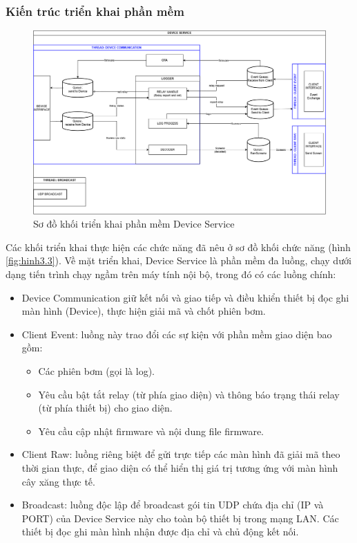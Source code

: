 \subsubsection{Kiến trúc triển khai phần mềm}

\begin{figure}[!ht]
     \centering
    \includegraphics[width=1.0\linewidth]{Figures/DeviceService_implementation-block.png}
    \caption{Sơ đồ khối triển khai phần mềm Device Service}
    \label{fig:DeviceService_implementation-block}
\end{figure}

Các khối triển khai thực hiện các chức năng đã nêu ở
sơ đồ khối chức năng (hình \ref{fig:hinh3.3}). Về mặt triển khai, Device Service là phần mềm đa luồng, chạy dưới dạng tiến trình chạy ngầm trên máy tính nội bộ, trong đó có các luồng chính:
\begin{itemize}
    \item Device Communication giữ kết nối và giao tiếp và điều khiển thiết bị đọc ghi màn hình (Device), thực hiện giải mã và chốt phiên bơm.
    \item Client Event: luồng này trao đổi các sự kiện với phần mềm giao diện bao gồm:
    \begin{itemize}
        \item Các phiên bơm (gọi là log).
        \item Yêu cầu bật tắt relay (từ phía giao diện) và thông báo trạng thái relay (từ phía thiết bị) cho giao diện.
        \item Yêu cầu cập nhật firmware và nội dung file firmware.
    \end{itemize}

    \item Client Raw: luồng riêng biệt để gửi trực tiếp các màn hình đã giải mã theo thời gian thực, để giao diện có thể hiển thị giá trị tương ứng với màn hình cây xăng thực tế.
    
    \item Broadcast: luồng độc lập để broadcast gói tin UDP chứa địa chỉ (IP và PORT) của Device Service này cho toàn bộ thiết bị trong mạng LAN. Các thiết bị đọc ghi màn hình nhận được địa chỉ và chủ động kết nối.
\end{itemize}

